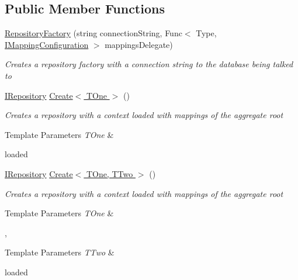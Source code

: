 \subsection*{Public Member Functions}
\begin{DoxyCompactItemize}
\item 
\hyperlink{class_highway_1_1_data_1_1_entity_framework_1_1_factory_1_1_repository_factory_a11fcf7b715d125e390df596a4fcaf9a6}{Repository\-Factory} (string connection\-String, Func$<$ Type, \hyperlink{interface_highway_1_1_data_1_1_entity_framework_1_1_mappings_1_1_i_mapping_configuration}{I\-Mapping\-Configuration} $>$ mappings\-Delegate)
\begin{DoxyCompactList}\small\item\em Creates a repository factory with a connection string to the database being talked to \end{DoxyCompactList}\item 
\hyperlink{interface_highway_1_1_data_1_1_interfaces_1_1_i_repository}{I\-Repository} \hyperlink{class_highway_1_1_data_1_1_entity_framework_1_1_factory_1_1_repository_factory_adc2a8362d9f6eba603dc296f80a464d2}{Create$<$ T\-One $>$} ()
\begin{DoxyCompactList}\small\item\em Creates a repository with a context loaded with mappings of the aggregate root 
\begin{DoxyTemplParams}{Template Parameters}
{\em T\-One} & \\
\hline
\end{DoxyTemplParams}
loaded \end{DoxyCompactList}\item 
\hyperlink{interface_highway_1_1_data_1_1_interfaces_1_1_i_repository}{I\-Repository} \hyperlink{class_highway_1_1_data_1_1_entity_framework_1_1_factory_1_1_repository_factory_a77fab4a79881f8cdee299599b72b15ce}{Create$<$ T\-One, T\-Two $>$} ()
\begin{DoxyCompactList}\small\item\em Creates a repository with a context loaded with mappings of the aggregate root 
\begin{DoxyTemplParams}{Template Parameters}
{\em T\-One} & \\
\hline
\end{DoxyTemplParams}
,
\begin{DoxyTemplParams}{Template Parameters}
{\em T\-Two} & \\
\hline
\end{DoxyTemplParams}
loaded \end{DoxyCompactList}\item 

\end{DoxyCompactItemize}
